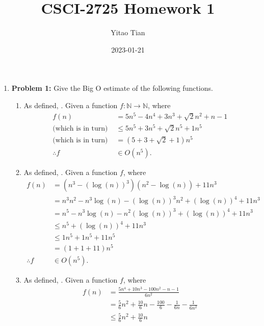 \documentclass[12pt, a4paper]{article}
\author{Yitao Tian}
\date{2023-01-21}
\title{}
\begin{document}
\title{CSCI-2725 Homework 1}

\maketitle

\begin{enumerate}
	\item \textbf{Problem 1:} Give the Big O estimate of the following functions. \label{1}
		\begin{enumerate}
		
			\item As defined, . Given a function $f: \mathbb{N} \rightarrow \mathbb{N}$, where
			\begin{align*}
				f(n)                     & = 5n^5 - 4n^4 + 3n^3 + \sqrt{2}n^2 + n - 1 \\
					\textrm{(which is in turn) } & \leq 5n^5 + 3n^5 + \sqrt{2}n^5 + 1n^5 \\
					\textrm{(which is in turn) } & = (5 + 3 + \sqrt{2} + 1) n^5 \\
				\therefore f             & \in O(n^{5}).
			\end{align*} \label{1(a)}
			\item As defined, . Given a function $f$, where
			\begin{align*}
				f(n)         & = (n^3 - (\log(n))^3)(n^2 - \log(n)) + 11n^3 \\
					         & = n^3n^2 - n^3\log(n) - (\log(n))^3n^2 + (\log(n))^4 + 11n^3 \\
					         & = n^5 - n^3\log(n) - n^2(\log(n))^3 + (\log(n))^4 + 11n^3 \\
					         & \leq n^5 + (\log(n))^4 + 11n^3 \\
					         & \leq 1n^5 + 1n^5 + 11n^5 \\
					         & = (1 + 1 + 11) n^5 \\
				\therefore f & \in O(n^5).
			\end{align*} \label{1(b)}
			\item As defined, . Given a function $f$, where
			\begin{align*}
				f(n)         & = \frac{5n^4 + 10n^3 - 100n^2 - n - 1}{6n^2} \\
					         & = \frac{5}{6}n^2 + \frac{10}{6}n - \frac{100}{6} - \frac{1}{6n} - \frac{1}{6n^2} \\
					         & \leq \frac{5}{6}n^2 + \frac{10}{6}n \\

\end{align*}
\end{enumerate}
\end{enumerate}
\end{document}
